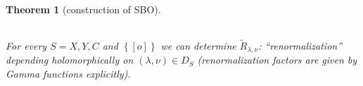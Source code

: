 \documentclass[portrait,final,paperwidth=90cm,paperheight=120cm,fontscale=0.3]{baposter}
\newcommand{\same}{\dots\mbox{(similar)}}
\newcommand{\tmop}[1]{\ensuremath{\operatorname{#1}}}
\newtheorem{theorem}{Theorem}
\theoremstyle{definition}
\newcommand{\mm}{\mid\mid}
\newcommand{\bb}{\backslash\backslash}
\begin{document}
\begin{poster}
{\begin{theorem}[construction of SBO]
\begin{center}
\begin{tabular}{@{}|@{}c@{}|c|@{}c@{}|}
\end{tabular}
	\end{center}
	\vspace{-0.3cm}
	For every $S=X,Y,C$ and $\left\{ [o] \right\}$ we can
	determine $\tilde{R}_{\lambda,\nu}$: ``renormalization'' 
	depending {\it holomorphically} on $(\lambda,\nu)\in D_S$ (renormalization factors are given by Gamma functions explicitly).
\end{theorem}
}


\end{poster}
\end{document}
